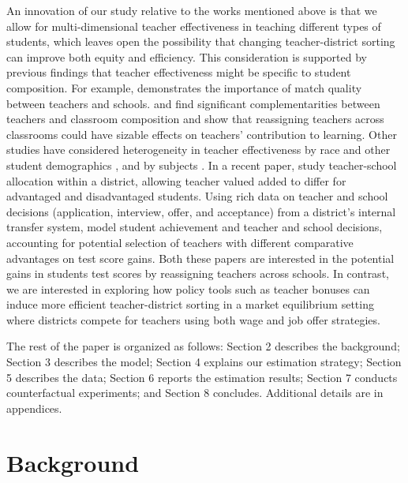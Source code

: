 \documentclass[notitlepage,12pt]{article}%
\begin{document}
An innovation of our study relative to the works mentioned above is that we
allow for multi-dimensional teacher effectiveness in teaching different types
of students, which leaves open the possibility that changing teacher-district
sorting can improve both equity and efficiency. This consideration is
supported by previous findings that teacher effectiveness might be specific to
student composition. For example, \citet{jackson2013match} demonstrates the
importance of match quality between teachers and schools.
\citet{aucejo2019match} and \citet{graham2020teacher} find significant
complementarities between teachers and classroom composition and show that
reassigning teachers across classrooms could have sizable effects on teachers'
contribution to learning. Other studies have considered heterogeneity in
teacher effectiveness by race \citep{dee2004teachers,gershenson2022long} and
other student demographics \citep{lavy2016makes, bates2022teacher}, and by
subjects \citep{fox2016playing}. In a recent paper, \citet{bates2022teacher}
study teacher-school allocation within a district, allowing teacher valued
added to differ for advantaged and disadvantaged students. Using rich
data on teacher and school decisions (application, interview, offer, and
acceptance) from a district's internal transfer system, \citet{laverde2025gains}
model student achievement and teacher and school decisions, accounting for
potential selection of teachers with different comparative advantages on test
score gains. Both these papers are interested in the potential gains in
students test scores by reassigning teachers across schools. In contrast, we
are interested in exploring how policy tools such as teacher bonuses can
induce more efficient teacher-district sorting in a market equilibrium setting
where districts compete for teachers using both wage and job offer strategies.

The rest of the paper is organized as follows: Section 2 describes the
background; Section 3 describes the model; Section 4 explains our estimation
strategy; Section 5 describes the data; Section 6 reports the estimation
results; Section 7 conducts counterfactual experiments; and Section 8
concludes. Additional details are in appendices.

\section{Background\label{bg}}
\end{document}
